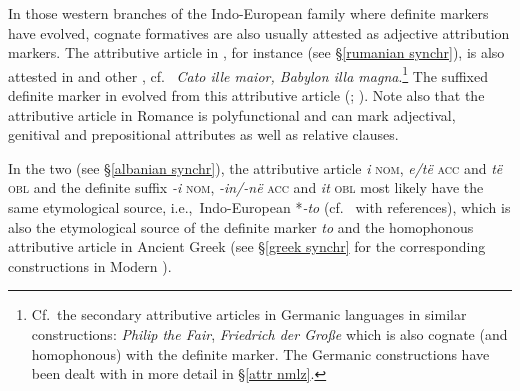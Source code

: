 {In those western branches of the Indo-European family where definite markers have evolved, cognate formatives are also usually attested as adjective attribution markers. The attributive article in , for instance (see \S\ref{rumanian synchr}), is also attested in  and other , cf.~ \textit{Cato ille maior, Babylon illa magna}.\footnote{Cf.~the secondary attributive articles in Germanic languages in similar constructions:  \textit{Philip the Fair},  \textit{Friedrich der Große} which is also cognate (and homophonous) with the definite marker. The Germanic constructions have been dealt with in more detail in \S\ref{attr nmlz}.} The suffixed definite marker in  evolved from this attributive article (\citealt{gamillscheg1937}; \citealt[5]{nocentini1996}). Note also that the attributive article in Romance is polyfunctional and can mark adjectival, genitival and prepositional attributes as well as relative clauses.

In the two  (see \S\ref{albanian synchr}), the attributive article \textit{i} \textsc{nom}, \textit{e/të} \textsc{acc} and \textit{të} \textsc{obl} and the definite suffix \textit{-i} \textsc{nom}, \textit{-in/-në} \textsc{acc} and \textit{it} \textsc{obl} most likely have the same etymological source, i.e.,~Indo-European *\textit{-to} (cf.~\citet[165]{himmelmann1997} with references), which is also the etymological source of the definite marker \textit{to} and the homophonous attributive article in Ancient Greek (see \S\ref{greek synchr} for the corresponding constructions in Modern ).

}
